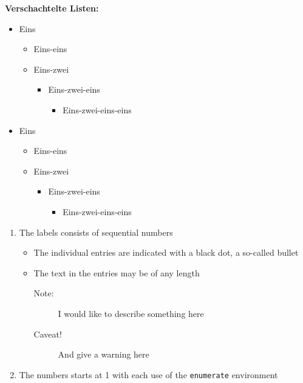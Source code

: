 \documentclass[a5paper]{article}
\begin{document}
\textbf{Verschachtelte Listen:}

\begin{itemize}
  \item Eins
  \begin{itemize}
  \item Eins-eins
  \item Eins-zwei
  \begin{itemize}
    \item Eins-zwei-eins
    \begin{itemize}
      \item Eins-zwei-eins-eins
    \end{itemize}
  \end{itemize}
  \end{itemize}
\end{itemize}


\begin{itemize}
  \item Eins
  \begin{itemize}
  \item Eins-eins
  \item Eins-zwei
  \begin{itemize}
    \item Eins-zwei-eins
    \begin{itemize}
      \item Eins-zwei-eins-eins
    \end{itemize}
  \end{itemize}
  \end{itemize}
\end{itemize}



\begin{enumerate}
   \item The labels consists of sequential numbers
   \begin{itemize}
     \item The individual entries are indicated with a black dot, a so-called bullet
     \item The text in the entries may be of any length
     \begin{description}
     \item[Note:] I would like to describe something here
     \item[Caveat!] And give a warning here
     \end{description}
   \end{itemize}
   \item The numbers starts at 1 with each use of the \texttt{enumerate} environment
\end{enumerate}
\end{document}
